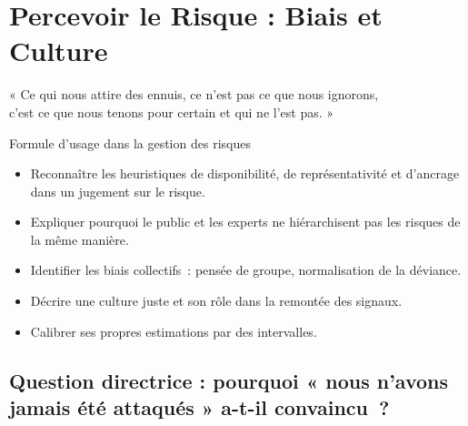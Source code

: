 
\chapter{Percevoir le Risque : Biais et Culture}
\label{chap:perception}

\epigraph{%
    « Ce qui nous attire des ennuis, ce n'est pas ce que nous ignorons,\\
    c'est ce que nous tenons pour certain et qui ne l'est pas. »%
}{Formule d'usage dans la gestion des risques}


\begin{boxobjectifs}
\begin{itemize}
    \item Reconnaître les heuristiques de disponibilité, de représentativité
          et d'ancrage dans un jugement sur le risque.
    \item Expliquer pourquoi le public et les experts ne hiérarchisent pas
          les risques de la même manière.
    \item Identifier les biais collectifs~: pensée de groupe, normalisation
          de la déviance.
    \item Décrire une culture juste et son rôle dans la remontée des
          signaux.
    \item Calibrer ses propres estimations par des intervalles.
\end{itemize}
\end{boxobjectifs}

\bigskip

\section*{Question directrice : pourquoi « nous n'avons jamais été attaqués » a-t-il convaincu~?}

